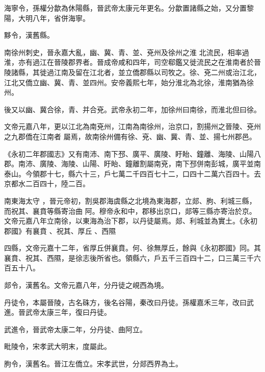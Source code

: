 \begin{pinyinscope}
 海寧令，孫權分歙為休陽縣，晉武帝太康元年更名。分歙置諸縣之始，又分置黎陽，大明八年，省併海寧。



 黟令，漢舊縣。



 南徐州刺史，晉永嘉大亂，幽、冀、青、並、兗州及徐州之淮
 北流民，相率過淮，亦有過江在晉陵郡界者。晉成帝咸和四年，司空郗鑑又徙流民之在淮南者於晉陵諸縣，其徙過江南及留在江北者，並立僑郡縣以司牧之。徐、兗二州或治江北，江北又僑立幽、冀、青、並四州。安帝義熙七年，始分淮北為北徐，淮南猶為徐州。



 後又以幽、冀合徐，青、并合兗。武帝永初二年，加徐州曰南徐，而淮北但曰徐。



 文帝元嘉八年，更以江北為南兗州，江南為南徐州，治京口，割揚州之晉陵、兗州之九郡僑在江南者
 屬焉，故南徐州備有徐、兗、幽、冀、青、並、揚七州郡邑。



 《永初二年郡國志》又有南沛、南下邳、廣平、廣陵、盱眙、鐘離、海陵、山陽八郡。南沛、廣陵、海陵、山陽、盱眙、鐘離割屬南兗，南下邳併南彭城，廣平並南泰山。今領郡十七，縣六十三，戶七萬二千四百七十二，口四十二萬六百四十。去京都水二百四十，陸二百。


南東海太守
 ，晉元帝初，割吳郡海虞縣之北境為東海郡，立郯、朐、利城三縣，而祝其、襄賁等縣寄治曲
 阿。穆帝永和中，郡移出京口，郯等三縣亦寄治於京。文帝元嘉八年立南徐，以東海為治下郡，以丹徒屬焉。郯、利城並為實土。《永初郡國》有襄賁
 、祝其、厚丘
 、西隰



 四縣，文帝元嘉十二年，省厚丘併襄賁。何、徐無厚丘，餘與《永初郡國》同。其襄賁、祝其、西隰，是徐志後所省也。領縣六，戶五千三百四十二，口三萬三千六百五十八。



 郯令，漢舊名。文帝元嘉八年，分丹徒之峴西為境。



 丹徒令，本屬晉陵，古名硃方，後名谷陽，秦改曰丹徒。孫權嘉禾三年，改曰武進。晉武帝太康三年，復曰丹徒。



 武進令，晉武帝太康二年，分丹徒、曲阿立。



 毗陵令，宋孝武大明末，度屬此。



 朐令，漢舊名。晉江左僑立。宋孝武世，分郯西界為土。




\end{pinyinscope}
